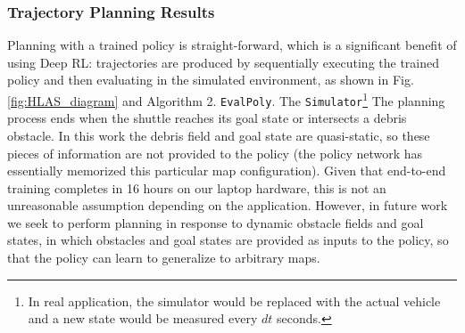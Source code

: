 \documentclass{UnderReview}
\begin{document}
\subsubsection{Trajectory Planning Results}
Planning with a trained policy is straight-forward, which is a significant benefit of using Deep RL: trajectories are produced by sequentially executing the trained policy and then evaluating in the simulated environment, as shown in Fig. \ref{fig:HLAS_diagram} and Algorithm 2.   \verb|EvalPoly|.  The \verb|Simulator|\footnote{In real application, the simulator would be replaced with the actual vehicle and a new state would be measured every $dt$ seconds.}   
The planning process ends when the shuttle reaches its goal state or intersects a debris obstacle.  In this work the debris field and goal state are quasi-static, so these pieces of information are not provided to the policy (the policy network has essentially memorized this particular map configuration).  Given that end-to-end training completes in 16 hours on our laptop hardware, this is not an unreasonable assumption depending on the application.  However, in future work we seek to perform planning in response to dynamic obstacle fields and goal states, in which obstacles and goal states are provided as inputs to the policy, so that the policy can learn to generalize to arbitrary maps.    
\end{document}
